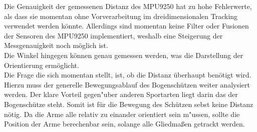 Die Genauigkeit der gemessenen Distanz des MPU9250 hat zu hohe Fehlerwerte, als 
dass sie momentan ohne Vorverarbeitung im dreidimensionalen Tracking verwendet werden könnte.
Allerdings sind momentan keine Filter oder Fusionen der Sensoren des MPU9250 implementiert,
weshalb eine Steigerung der Messgenauigkeit noch möglich ist.\\
Die Winkel hingegen können genau gemessen werden, was die Darstellung der Orientierung 
ermöglicht.\\
Die Frage die sich momentan stellt, ist, ob die Distanz überhaupt benötigt wird. Hierzu 
muss der generelle Bewegungsablauf des Bogenschützen weiter analysiert werden. Der klare
Vorteil gegen"uber anderen Sportarten liegt darin das der Bogenschütze steht. Somit ist 
für die Bewegung des Schützen sebst keine Distanz nötig. Da die Arme alle relativ zu 
einander orientiert sein m"ussen, sollte die Position der Arme berechenbar sein, solange 
alle Gliedmaßen getrackt werden.